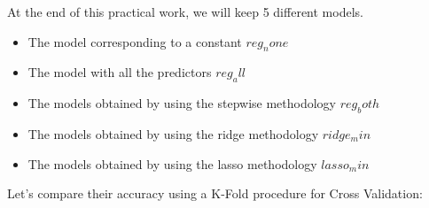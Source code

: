 \documentclass[
]{article}
\providecommand{\tightlist}{%
  \setlength{\itemsep}{0pt}\setlength{\parskip}{0pt}}
\begin{document}
At the end of this practical work, we will keep 5 different models.

\begin{itemize}
\tightlist
\item
  The model corresponding to a constant \(reg_none\)
\item
  The model with all the predictors \(reg_all\)
\item
  The models obtained by using the stepwise methodology \(reg_both\)
\item
  The models obtained by using the ridge methodology \(ridge_min\)
\item
  The models obtained by using the lasso methodology \(lasso_min\)
\end{itemize}

Let's compare their accuracy using a K-Fold procedure for Cross
Validation:
\end{document}

